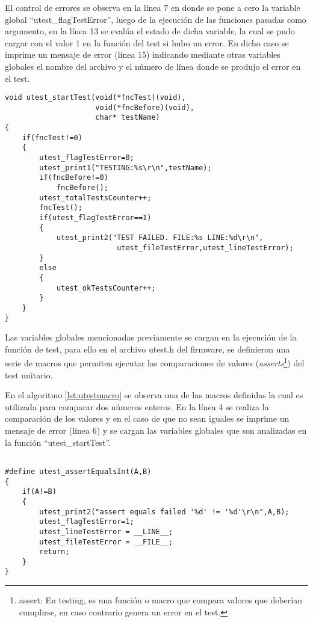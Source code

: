El control de errores se observa en la línea 7 en donde se pone a cero la variable global “utest\_flagTestError”, luego de la ejecución de las funciones pasadas como argumento, en la línea 13 se evalúa el estado de dicha variable, la cual se pudo cargar con el valor 1 en la función del test si hubo un error. En dicho caso se imprime un mensaje de error (línea 15) indicando mediante otras variables globales el nombre del archivo y el número de línea donde se produjo el error en el test.

\begin{lstlisting}[label={lst:utest},caption=Función que ejecuta un test unitario incluida en el archivo utest.c del firmware.]
void utest_startTest(void(*fncTest)(void),
                     void(*fncBefore)(void),
                     char* testName)
{
	if(fncTest!=0)
	{
		utest_flagTestError=0;
		utest_print1("TESTING:%s\r\n",testName);
		if(fncBefore!=0)
			fncBefore();
		utest_totalTestsCounter++;
		fncTest();
		if(utest_flagTestError==1)
		{
			utest_print2("TEST FAILED. FILE:%s LINE:%d\r\n",
			              utest_fileTestError,utest_lineTestError);
		}
		else
		{
			utest_okTestsCounter++;
		}
	}
} 
\end{lstlisting}

Las variables globales mencionadas previamente se cargan en la ejecución de la función de test, para ello en el archivo utest.h del firmware, se definieron una serie de macros que permiten ejecutar las comparaciones de valores (\textit{asserts}\footnote{assert: En testing, es una función o macro que compara valores que deberían cumplirse, en caso contrario genera un error en el test.}) del test unitario.

En el algoritmo \ref{lst:utestmacro} se observa una de las macros definidas la cual es utilizada para comparar dos números enteros. En la línea 4 se realiza la comparación de los valores y en el caso de que no sean iguales se imprime un mensaje de error (línea 6) y se cargan las variables globales que son analizadas en la función “utest\_startTest”.

\begin{lstlisting}[label={lst:utestmacro},caption=Ejemplo de una macro assert incluida en el archivo utest.h del firmware.]

#define utest_assertEqualsInt(A,B)	
{ 
	if(A!=B)
	{ 
		utest_print2("assert equals failed '%d' != '%d'\r\n",A,B); 
		utest_flagTestError=1; 
		utest_lineTestError = __LINE__;  
		utest_fileTestError = __FILE__;
		return; 
	} 
}
\end{lstlisting}

